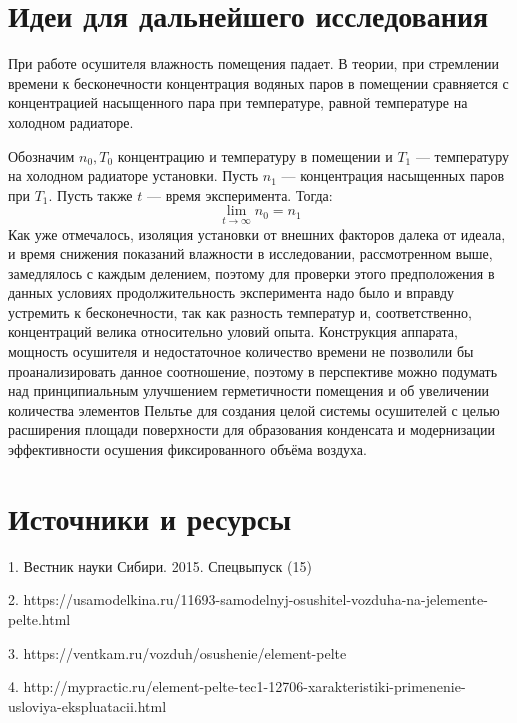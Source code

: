 \documentclass[a4paper,12pt]{article} %
\begin{document}
{\newpage


\section{Идеи для дальнейшего исследования}
При работе осушителя влажность помещения падает. В теории, при стремлении времени к бесконечности концентрация водяных паров в помещении сравняется с концентрацией насыщенного пара при температуре, равной температуре на холодном радиаторе.

Обозначим $n_0, T_0$ концентрацию и температуру в помещении и $T_1$ --- температуру на холодном радиаторе установки. Пусть $n_1$ --- концентрация насыщенных паров при $T_1$. Пусть также $t$ --- время эксперимента. Тогда:
$$\lim\limits_{t \to \infty} n_0 = n_1$$
Как уже отмечалось, изоляция установки от внешних факторов далека от идеала, и время снижения показаний влажности в исследовании, рассмотренном выше, замедлялось с каждым делением, поэтому для проверки этого предположения в данных условиях продолжительность эксперимента надо было и вправду устремить к бесконечности, так как разность температур и, соответственно, концентраций велика относительно уловий опыта. Конструкция аппарата, мощность осушителя и недостаточное количество времени не позволили бы проанализировать данное соотношение, поэтому в перспективе можно подумать над принципиальным улучшением герметичности помещения и об увеличении количества элементов Пельтье для создания целой системы осушителей с целью расширения площади поверхности для образования конденсата и модернизации эффективности осушения фиксированного объёма воздуха.

\newpage


\section{Источники и ресурсы}

1. Вестник науки Сибири. 2015. Спецвыпуск (15)

2. https://usamodelkina.ru/11693-samodelnyj-osushitel-vozduha-na-jelemente-pelte.html

3. https://ventkam.ru/vozduh/osushenie/element-pelte

4. http://mypractic.ru/element-pelte-tec1-12706-xarakteristiki-primenenie-usloviya-ekspluatacii.html


}
\end{document}
